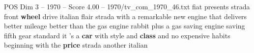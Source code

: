 \begin{textsample}{POS Dim 3 – 1970 – Score 4.00 – 1970/tv\_com\_1970\_46.txt}  \label{ex:f3_pos_031}
fiat presents strada front \textbf{wheel} drive italian flair strada with a remarkable new engine that delivers better mileage better than the gas engine rabbit plus a gas saving engine saving fifth gear standard it 's a \textbf{car} with style and \textbf{class} and no expensive habits beginning with the \textbf{price} strada another italian

\end{textsample}
